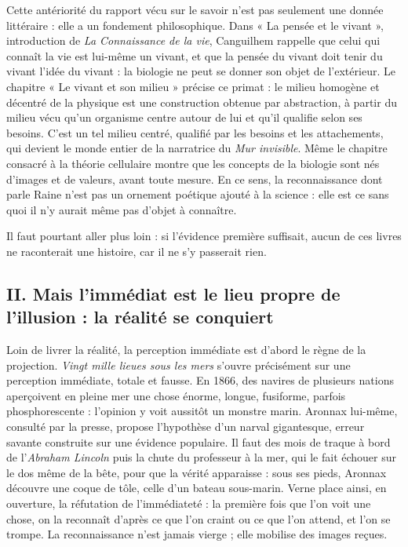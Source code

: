 \documentclass[11pt,a4paper]{article}
\begin{document}
Cette antériorité du rapport vécu sur le savoir n'est pas seulement une donnée littéraire : elle a un fondement philosophique. Dans « La pensée et le vivant », introduction de \emph{La Connaissance de la vie}, Canguilhem rappelle que celui qui connaît la vie est lui-même un vivant, et que la pensée du vivant doit tenir du vivant l'idée du vivant : la biologie ne peut se donner son objet de l'extérieur. Le chapitre « Le vivant et son milieu » précise ce primat : le milieu homogène et décentré de la physique est une construction obtenue par abstraction, à partir du milieu vécu qu'un organisme centre autour de lui et qu'il qualifie selon ses besoins. C'est un tel milieu centré, qualifié par les besoins et les attachements, qui devient le monde entier de la narratrice du \emph{Mur invisible}. Même le chapitre consacré à la théorie cellulaire montre que les concepts de la biologie sont nés d'images et de valeurs, avant toute mesure. En ce sens, la reconnaissance dont parle Raine n'est pas un ornement poétique ajouté à la science : elle est ce sans quoi il n'y aurait même pas d'objet à connaître.

Il faut pourtant aller plus loin : si l'évidence première suffisait, aucun de ces livres ne raconterait une histoire, car il ne s'y passerait rien.

\hypertarget{ii.-mais-limmuxe9diat-est-le-lieu-propre-de-lillusion-la-ruxe9alituxe9-se-conquiert}{%
\subsection{II. Mais l'immédiat est le lieu propre de l'illusion : la réalité se conquiert}\label{ii.-mais-limmuxe9diat-est-le-lieu-propre-de-lillusion-la-ruxe9alituxe9-se-conquiert}}

Loin de livrer la réalité, la perception immédiate est d'abord le règne de la projection. \emph{Vingt mille lieues sous les mers} s'ouvre précisément sur une perception immédiate, totale et fausse. En 1866, des navires de plusieurs nations aperçoivent en pleine mer une chose énorme, longue, fusiforme, parfois phosphorescente : l'opinion y voit aussitôt un monstre marin. Aronnax lui-même, consulté par la presse, propose l'hypothèse d'un narval gigantesque, erreur savante construite sur une évidence populaire. Il faut des mois de traque à bord de l'\emph{Abraham Lincoln} puis la chute du professeur à la mer, qui le fait échouer sur le dos même de la bête, pour que la vérité apparaisse : sous ses pieds, Aronnax découvre une coque de tôle, celle d'un bateau sous-marin. Verne place ainsi, en ouverture, la réfutation de l'immédiateté : la première fois que l'on voit une chose, on la reconnaît d'après ce que l'on craint ou ce que l'on attend, et l'on se trompe. La reconnaissance n'est jamais vierge ; elle mobilise des images reçues.
\end{document}
